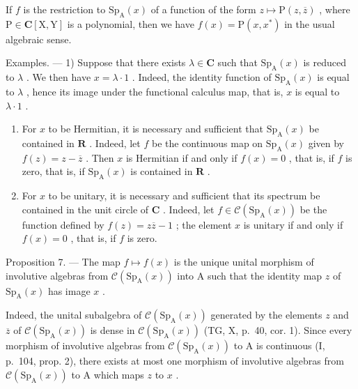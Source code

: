 If \(f\) is the restriction to \(\mathrm{Sp}_{\mathrm{A}}(x)\) of a function of the form \(z \mapsto \mathrm{P}(z, \overline{z})\) , where \(\mathrm{P} \in \mathbf{C}[\mathrm{X}, \mathrm{Y}]\) is a polynomial, then we have \(f(x) = \mathrm{P}(x, x^{*})\) in the usual algebraic sense.

Examples. --- 1) Suppose that there exists \(\lambda \in \mathbf{C}\) such that \(\mathrm{Sp}_{\mathrm{A}}(x)\) is reduced to \(\lambda\) . We then have \(x = \lambda \cdot 1\) . Indeed, the identity function of \(\mathrm{Sp}_{\mathrm{A}}(x)\) is equal to \(\lambda\) , hence its image under the functional calculus map, that is, \(x\) is equal to \(\lambda \cdot 1\) .

\begin{enumerate}
\def\labelenumi{\arabic{enumi})}
\setcounter{enumi}{1}
\item
  For \(x\) to be Hermitian, it is necessary and sufficient that \(\mathrm{Sp}_{\mathrm{A}}(x)\) be contained in \(\mathbf{R}\) . Indeed, let \(f\) be the continuous map on \(\mathrm{Sp}_{\mathrm{A}}(x)\) given by \(f(z) = z - \overline{z}\) . Then \(x\) is Hermitian if and only if \(f(x) = 0\) , that is, if \(f\) is zero, that is, if \(\mathrm{Sp}_{\mathrm{A}}(x)\) is contained in \(\mathbf{R}\) .
\item
  For \(x\) to be unitary, it is necessary and sufficient that its spectrum be contained in the unit circle of \(\mathbf{C}\) . Indeed, let \(f \in \mathcal{C}(\mathrm{Sp}_{\mathrm{A}}(x))\) be the function defined by \(f(z) = z\overline{z} - 1\) ; the element \(x\) is unitary if and only if \(f(x) = 0\) , that is, if \(f\) is zero.
\end{enumerate}

Proposition 7. — The map \(f \mapsto f(x)\) is the unique unital morphism of involutive algebras from \(\mathcal{C}(\mathrm{Sp}_{\mathrm{A}}(x))\) into A such that the identity map \(z\) of \(\mathrm{Sp}_{\mathrm{A}}(x)\) has image \(x\) .

Indeed, the unital subalgebra of \(\mathcal{C}(\mathrm{Sp}_{\mathrm{A}}(x))\) generated by the elements \(z\) and \(\overline{z}\) of \(\mathcal{C}(\mathrm{Sp}_{\mathrm{A}}(x))\) is dense in \(\mathcal{C}(\mathrm{Sp}_{\mathrm{A}}(x))\) (TG, X, p.~40, cor. 1). Since every morphism of involutive algebras from \(\mathcal{C}(\mathrm{Sp}_{\mathrm{A}}(x))\) to A is continuous (I, p.~104, prop. 2), there exists at most one morphism of involutive algebras from \(\mathcal{C}(\mathrm{Sp}_{\mathrm{A}}(x))\) to A which maps \(z\) to \(x\) .

